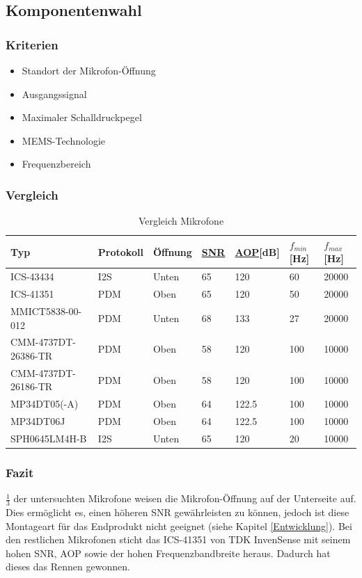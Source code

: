 \documentclass[12pt]{article}
\begin{document}
	\subsection{Komponentenwahl}
	\subsubsection{Kriterien}
	\begin{itemize}
		\item Standort der Mikrofon-Öffnung
		\item Ausgangssignal
		\item Maximaler Schalldruckpegel
		\item MEMS-Technologie
		\item Frequenzbereich
	\end{itemize}
	\subsubsection{Vergleich}
	\begin{table}[H]
		\centering
		\begin{tabular}{|l|l|l|l|l|l|l|}
			\hline
			\textbf{Typ} & \textbf{Protokoll} & \textbf{Öffnung} & \textbf{\hyperref[SNR]{SNR}} & \textbf{\hyperref[AOP]{AOP}[dB]} & \textbf{$f_{min}$ [Hz]} & \textbf{$f_{max}$[Hz]} \\\hline
	ICS-43434 & I2S & Unten & 65 & 120 & 60 & 20000 \\ \hline
	ICS-41351 & PDM & Oben & 65 & 120 & 50 & 20000 \\ \hline
	MMICT5838-00-012 & PDM & Unten & 68 & 133 & 27 & 20000 \\ \hline
	CMM-4737DT-26386-TR & PDM & Oben & 58 & 120 & 100 & 10000 \\ \hline
	CMM-4737DT-26186-TR & PDM & Oben & 58 & 120 & 100 & 10000 \\ \hline
	MP34DT05(-A) & PDM & Oben & 64 & 122.5 & 100 & 10000 \\ \hline
	MP34DT06J & PDM & Oben & 64 & 122.5 & 100 & 10000 \\ \hline
	SPH0645LM4H-B & I2S & Unten & 65 & 120 & 20 & 10000 \\ \hline
	\end{tabular}
	\caption{Vergleich Mikrofone}
	\label{table:vergleich-mikrofone}
\end{table}

	\subsubsection{Fazit}
	$\frac{1}{3}$ der untersuchten Mikrofone weisen die Mikrofon-Öffnung auf der Unterseite auf. Dies ermöglicht es, einen höheren SNR gewährleisten zu können, jedoch ist diese Montageart für das Endprodukt nicht geeignet (siehe Kapitel \ref{Entwicklung}). Bei den restlichen Mikrofonen sticht das ICS-41351 von TDK InvenSense mit seinem hohen SNR, AOP sowie der hohen Frequenzbandbreite heraus. Dadurch hat dieses das Rennen gewonnen.
	\newpage
\end{document}
